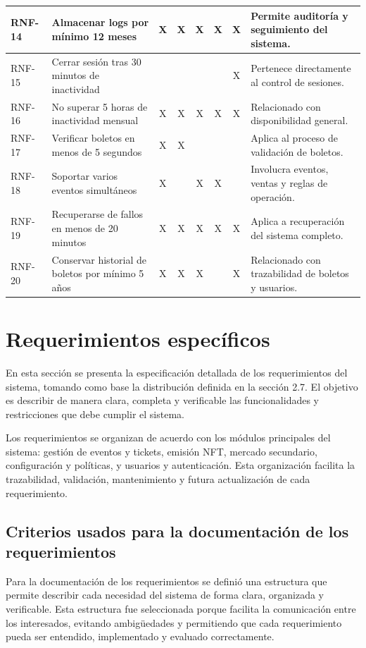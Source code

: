 \documentclass[12pt,letterpaper]{article}
\begin{document}
\begin{table}[htbp]
\begin{tabularx}{\textwidth}{|p{1.2cm}|X|c|c|c|c|c|X|}
RNF-14 & Almacenar logs por mínimo 12 meses & X & X & X & X & X & Permite auditoría y seguimiento del sistema. \\ \hline
RNF-15 & Cerrar sesión tras 30 minutos de inactividad &  &  &  &  & X & Pertenece directamente al control de sesiones. \\ \hline
RNF-16 & No superar 5 horas de inactividad mensual & X & X & X & X & X & Relacionado con disponibilidad general. \\ \hline
RNF-17 & Verificar boletos en menos de 5 segundos & X & X &  &  &  & Aplica al proceso de validación de boletos. \\ \hline
RNF-18 & Soportar varios eventos simultáneos & X &  & X & X &  & Involucra eventos, ventas y reglas de operación. \\ \hline
RNF-19 & Recuperarse de fallos en menos de 20 minutos & X & X & X & X & X & Aplica a recuperación del sistema completo. \\ \hline
RNF-20 & Conservar historial de boletos por mínimo 5 años & X & X & X &  & X & Relacionado con trazabilidad de boletos y usuarios. \\ \hline

\end{tabularx}

\normalsize
\end{table}
\begingroup
\tiny
\normalsize
\clearpage
\section{Requerimientos específicos}
En esta sección se presenta la especificación detallada de los requerimientos del sistema, tomando como base la distribución definida en la sección 2.7. El objetivo es describir de manera clara, completa y verificable las funcionalidades y restricciones que debe cumplir el sistema.

Los requerimientos se organizan de acuerdo con los módulos principales del sistema: gestión de eventos y tickets, emisión NFT, mercado secundario, configuración y políticas, y usuarios y autenticación. Esta organización facilita la trazabilidad, validación, mantenimiento y futura actualización de cada requerimiento.
\subsection{Criterios usados para la documentación de los requerimientos}
Para la documentación de los requerimientos se definió una estructura que permite describir cada necesidad del sistema de forma clara, organizada y verificable. Esta estructura fue seleccionada porque facilita la comunicación entre los interesados, evitando ambigüedades y permitiendo que cada requerimiento pueda ser entendido, implementado y evaluado correctamente.
\end{document}
